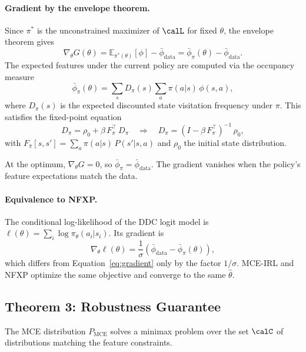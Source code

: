 \documentclass[10pt]{article}
\newcommand{\E}{\mathbb{E}}
\begin{document}
\paragraph{Gradient by the envelope theorem.}
Since $\pi^*$ is the unconstrained maximizer of $\calL$ for fixed $\theta$, the envelope theorem gives
\begin{equation}
\label{eq:gradient}
\nabla_\theta G(\theta) = \E_{\pi^*(\theta)}[\phi] - \bar\phi_{\text{data}} = \bar\phi_\pi(\theta) - \bar\phi_{\text{data}}.
\end{equation}
The expected features under the current policy are computed via the occupancy measure
\begin{equation}
\bar\phi_\pi(\theta) = \sum_{s} D_\pi(s) \sum_{a} \pi(a|s)\, \phi(s,a),
\end{equation}
where $D_\pi(s)$ is the expected discounted state visitation frequency under $\pi$. This satisfies the fixed-point equation
\begin{equation}
\label{eq:occupancy}
D_\pi = \rho_0 + \beta\, F_\pi^\top\, D_\pi \quad \Longrightarrow \quad D_\pi = (I - \beta\, F_\pi^\top)^{-1}\, \rho_0,
\end{equation}
with $F_\pi[s,s'] = \sum_a \pi(a|s)\, P(s'|s,a)$ and $\rho_0$ the initial state distribution.

At the optimum, $\nabla_\theta G = 0$, so $\bar\phi_\pi = \bar\phi_{\text{data}}$. The gradient vanishes when the policy's feature expectations match the data.

\paragraph{Equivalence to NFXP.}
The conditional log-likelihood of the DDC logit model is $\ell(\theta) = \sum_i \log \pi_\theta(a_i|s_i)$. Its gradient is
\begin{equation}
\nabla_\theta \ell(\theta) = \frac{1}{\sigma}\!\left(\bar\phi_{\text{data}} - \bar\phi_\pi(\theta)\right),
\end{equation}
which differs from Equation~\eqref{eq:gradient} only by the factor $1/\sigma$. MCE-IRL and NFXP optimize the same objective and converge to the same $\hat\theta$.


\subsection{Theorem 3: Robustness Guarantee}

The MCE distribution $P_{\text{MCE}}$ solves a minimax problem over the set $\calC$ of distributions matching the feature constraints.
\end{document}
